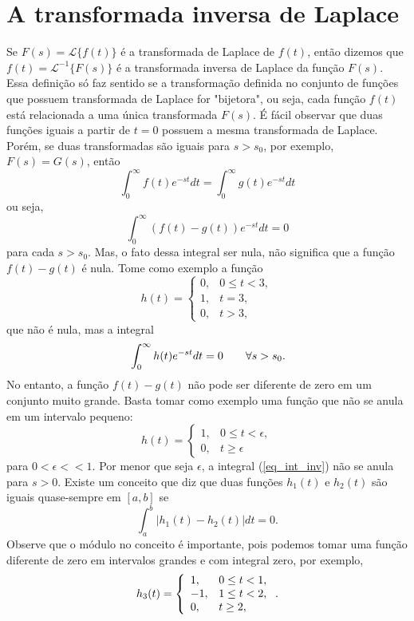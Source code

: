 \section{A transformada inversa de Laplace}
Se $F(s)=\mathcal{L}\{ f(t)\}$ é a transformada de Laplace de $f(t)$, então dizemos que $f(t)=\mathcal{L}^{-1}\{ F(s)\}$ é a transformada inversa de Laplace da função $F(s)$. Essa definição só faz sentido se a transformação definida no conjunto de funções que possuem transformada de Laplace for "bijetora", ou seja, cada função $f(t)$ está relacionada a uma única transformada $F(s)$. É fácil observar que duas funções iguais a partir de $t=0$ possuem a mesma transformada de Laplace. Porém, se duas transformadas são iguais para $s>s_0$, por exemplo, $F(s)=G(s)$, então
$$
\int_0^\infty f(t)e^{-st}dt=\int_0^\infty g(t)e^{-st}dt
$$
ou seja,
$$
\int_0^\infty (f(t)-g(t))e^{-st}dt=0
$$
para cada $s>s_0$. Mas, o fato dessa integral ser nula, não significa que a função $f(t)-g(t)$ é nula. Tome como exemplo a função
$$
h(t)=\left\{\begin{array}{ll} 0,& 0\leq t< 3,\\1,& t= 3,\\0,& t> 3,  \end{array}\right.
$$
que não é nula, mas a integral 
\begin{equation}{\label{eq_int_inv}}
\int_0^\infty h(t)e^{-st}dt=0\qquad \forall s>s_0.
\end{equation}
No entanto, a função $f(t)-g(t)$ não pode ser diferente de zero em um conjunto muito grande. Basta tomar como exemplo uma função que não se anula em um intervalo pequeno:
$$
h(t)=\left\{\begin{array}{ll} 1,& 0\leq t< \epsilon,\\0,& t\geq \epsilon  \end{array}\right.
$$
para $0<\epsilon<<1$. Por menor que seja $\epsilon$, a integral (\ref{eq_int_inv}) não se anula para $s>0$. Existe um conceito que diz que duas funções $h_1(t)$ e $h_2(t)$ são iguais quase-sempre em $[a,b]$ se 
$$
\int_a^b |h_1(t)-h_2(t)|dt=0.
$$
Observe que o módulo no conceito é importante, pois podemos tomar uma função diferente de zero em intervalos grandes e com integral zero, por exemplo,
\begin{equation}{\label{eq_lap_inv}}
h_3(t)=\left\{\begin{array}{ll} 1,& 0\leq t< 1,\\-1,& 1\leq t< 2,\\0,& t\geq 2,  \end{array}\right..
\end{equation}

